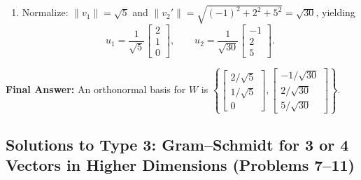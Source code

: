 \documentclass[11pt, letterpaper]{article}
\theoremstyle{definition}
\theoremstyle{remark}
\begin{document}
\begin{enumerate}[label=\textbf{Step \arabic*:}]
    \item Normalize: $\|v_1\| = \sqrt{5}$ and $\|v_2'\| = \sqrt{(-1)^2 + 2^2 + 5^2} = \sqrt{30}$, yielding
    \[
        u_1 = \frac{1}{\sqrt{5}}\begin{bmatrix} 2 \\ 1 \\ 0 \end{bmatrix}, \qquad u_2 = \frac{1}{\sqrt{30}}\begin{bmatrix} -1 \\ 2 \\ 5 \end{bmatrix}.
    \]
\end{enumerate}
\textbf{Final Answer:} An orthonormal basis for $W$ is $\left\{ \begin{bmatrix} 2/\sqrt{5} \\ 1/\sqrt{5} \\ 0 \end{bmatrix}, \begin{bmatrix} -1/\sqrt{30} \\ 2/\sqrt{30} \\ 5/\sqrt{30} \end{bmatrix} \right\}$.

\subsection{Solutions to Type 3: Gram--Schmidt for 3 or 4 Vectors in Higher Dimensions (Problems 7--11)}
\end{document}
